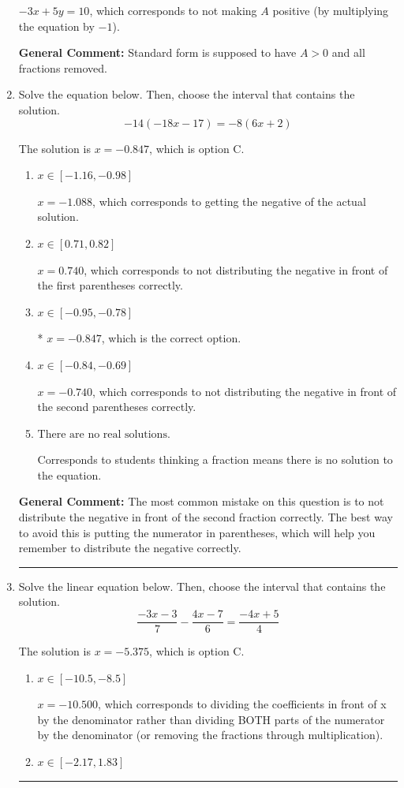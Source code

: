 \documentclass{extbook}[14pt]
\newcommand{\litem}[1]{\item #1

\rule{\textwidth}{0.4pt}}
\begin{document}
\begin{enumerate}
{\begin{enumerate}[label=\Alph*.]
 $-3x + 5y = 10$, which corresponds to not making $A$ positive (by multiplying the equation by $-1$).
\end{enumerate}

\textbf{General Comment:} Standard form is supposed to have $A > 0$ and all fractions removed.
}
\litem{
Solve the equation below. Then, choose the interval that contains the solution.
\[ -14(-18x -17) = -8(6x + 2) \]

The solution is \( x = -0.847 \), which is option C.\begin{enumerate}[label=\Alph*.]
\item \( x \in [-1.16, -0.98] \)

$x = -1.088$, which corresponds to getting the negative of the actual solution.
\item \( x \in [0.71, 0.82] \)

$x = 0.740$, which corresponds to not distributing the negative in front of the first parentheses correctly.
\item \( x \in [-0.95, -0.78] \)

* $x = -0.847$, which is the correct option.
\item \( x \in [-0.84, -0.69] \)

$x = -0.740$, which corresponds to not distributing the negative in front of the second parentheses correctly.
\item \( \text{There are no real solutions.} \)

Corresponds to students thinking a fraction means there is no solution to the equation.
\end{enumerate}

\textbf{General Comment:} The most common mistake on this question is to not distribute the negative in front of the second fraction correctly. The best way to avoid this is putting the numerator in parentheses, which will help you remember to distribute the negative correctly.
}
\litem{
Solve the linear equation below. Then, choose the interval that contains the solution.
\[ \frac{-3x -3}{7} - \frac{4x -7}{6} = \frac{-4x + 5}{4} \]

The solution is \( x = -5.375 \), which is option C.\begin{enumerate}[label=\Alph*.]
\item \( x \in [-10.5, -8.5] \)

 $x = -10.500$, which corresponds to dividing the coefficients in front of x by the denominator rather than dividing BOTH parts of the numerator by the denominator (or removing the fractions through multiplication).
\item \( x \in [-2.17, 1.83] \)


\end{enumerate}}
\end{enumerate}
\end{document}
